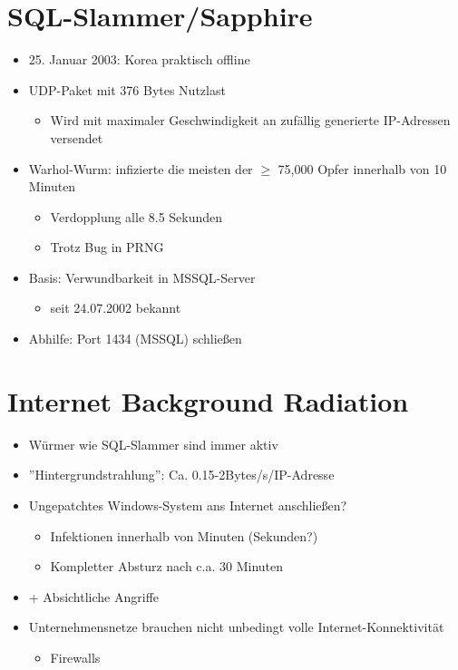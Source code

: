 \documentclass[openany]{book}
\begin{document}
\section{SQL-Slammer/Sapphire}

\begin{itemize}
    \item 25. Januar 2003: Korea praktisch offline
    \item UDP-Paket mit 376 Bytes Nutzlast
    \begin{itemize}
        \item Wird mit maximaler Geschwindigkeit an zufällig generierte IP-Adressen versendet
    \end{itemize}
    \item Warhol-Wurm: infizierte die meisten der $\geq$ 75,000 Opfer innerhalb von 10 Minuten
    \begin{itemize}
        \item Verdopplung alle 8.5 Sekunden
        \item Trotz Bug in PRNG
    \end{itemize}
    \item Basis: Verwundbarkeit in MSSQL-Server
    \begin{itemize}
        \item seit 24.07.2002 bekannt
    \end{itemize}
    \item Abhilfe: Port 1434 (MSSQL) schließen
\end{itemize}

\section{Internet Background Radiation}

\begin{itemize}
    \item Würmer wie SQL-Slammer sind immer aktiv
    \item ''Hintergrundstrahlung'': Ca. 0.15-2Bytes/s/IP-Adresse
    \item Ungepatchtes Windows-System ans Internet anschließen?
    \begin{itemize}
        \item Infektionen innerhalb von Minuten (Sekunden?)
        \item Kompletter Absturz nach c.a. 30 Minuten
    \end{itemize}
    \item + Absichtliche Angriffe
    \item Unternehmensnetze brauchen nicht unbedingt volle Internet-Konnektivität
    \begin{itemize}
        \item Firewalls
    \end{itemize}
\end{itemize}
\end{document}
